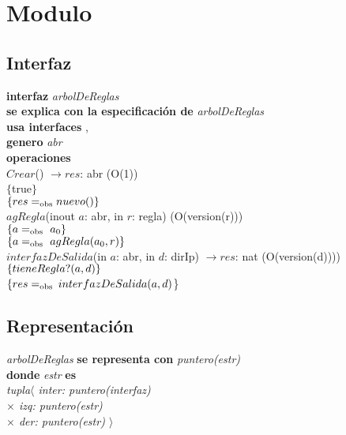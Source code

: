 \section*{Modulo }

\subsection*{Interfaz}
\textbf{interfaz} \textit{arbolDeReglas}\\
\textbf{se explica con la especificaci\'on de} \textit{arbolDeReglas}\\
\textbf{usa interfaces} , \\
\textbf{genero} \textit{abr}\\

\textbf{operaciones}\\

$Crear$() $\longrightarrow res$: abr \hfill (O(1)) \\
$\{$true$\}$\\
$\{{res} =_{\mathrm{obs}} nuevo()\}$\\

$agRegla$(inout $a$: abr, in $r$: regla) \hfill (O(version(r))) \\
$\{\sombreritoWide{a} \igobs\ a_0\}$\\
$\{\sombreritoWide{a} \igobs\ agRegla(a_0,\sombreritoWide{r})\}$\\

$interfazDeSalida$(in $a$: abr, in $d$: dirIp) $\longrightarrow res$: nat \hfill (O(version(d)))) \\
$\{tieneRegla?({a},{d})\}$\\
$\{{res}=_{\mathrm{obs}}$ $interfazDeSalida({a},{d})$\}\\


\subsection*{Representaci\'on}
\textit{arbolDeReglas} \textbf{se representa con} \textit{puntero(estr)}\\
\textbf{donde} \textit{estr} \textbf{es}\\
\textit{tupla$\langle$ inter: puntero(interfaz)\\
\hspace*{1.1cm}$\times$ izq: puntero(estr)\\
\hspace*{1.1cm}$\times$ der: puntero(estr) $\rangle$}
\vspace{33pt}


